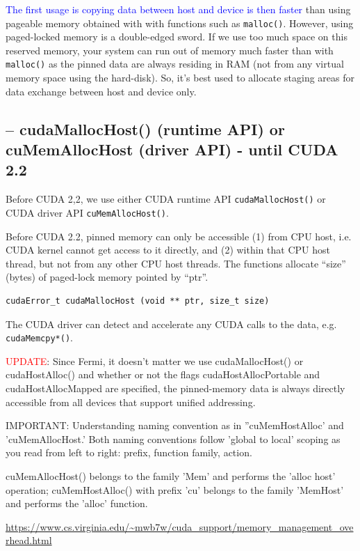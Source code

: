 \textcolor{blue}{The first usage is copying data between host and device is then
faster} than using pageable memory obtained with with functions such as
\verb!malloc()!. However, using paged-locked memory is a double-edged sword. If
we use too much space on this reserved memory, your system can run out of memory
much faster than with \verb!malloc()! as the pinned data are always residing in
RAM (not from any virtual memory space using the hard-disk). So, it's best used
to allocate staging areas for data exchange between host and device only.

\subsection{-- cudaMallocHost() (runtime API) or cuMemAllocHost (driver API) - until CUDA 2.2}
\label{sec:cudaMallocHost}

Before CUDA 2,2, we use either CUDA runtime API \verb!cudaMallocHost()! or CUDA
driver API \verb!cuMemAllocHost()!.

Before CUDA 2.2, pinned memory can only be accessible (1) from CPU host, i.e.
CUDA kernel cannot get access to it directly, and (2) within that CPU host
thread, but not from any other CPU host threads. The functions allocate ``size''
(bytes) of paged-lock memory pointed by ``ptr''.
\begin{verbatim}
cudaError_t cudaMallocHost (void ** ptr, size_t size)  
\end{verbatim}
The CUDA driver can detect and accelerate any CUDA calls to the data, e.g.
\verb!cudaMemcpy*()!. 

\textcolor{red}{UPDATE}: Since Fermi, it doesn't matter we use cudaMallocHost()
or cudaHostAlloc() and whether or not the flags cudaHostAllocPortable and
cudaHostAllocMapped are specified, the pinned-memory data is always directly
accessible from all devices that support unified addressing. 


IMPORTANT: Understanding naming convention as in ''cuMemHostAlloc' and
'cuMemAllocHost.' Both naming conventions follow  'global to local' scoping as
you read from left to right: prefix, function family, action.

cuMemAllocHost() belongs to the family 'Mem' and performs the 'alloc host'
operation; cuMemHostAlloc() with prefix 'cu' belongs to the family
'MemHost' and performs the 'alloc' function.

\url{https://www.cs.virginia.edu/~mwb7w/cuda_support/memory_management_overhead.html}

